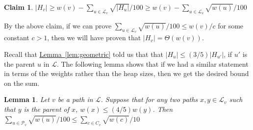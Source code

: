 \documentclass[11pt]{article}
\newtheorem{lemma}[theorem]{Lemma}
\newtheorem{claim}[theorem]{Claim}
\theoremstyle{definition}
\newcommand{\Lem}[1]{\hyperref[lem:#1]{Lemma~\ref*{lem:#1}}} %
\begin{document}
\begin{claim}
$|H_v|\geq w(v)-\sum_{u\in \mathcal{L}_v} \sqrt{|H_u|}/100 \geq w(v)-\sum_{u\in \mathcal{L}_v} \sqrt{w(u)}/100$
\end{claim}

By the above claim, if we can prove $\sum_{u\in \mathcal{L}_v} \sqrt{w(u)}/100 \leq w(v)/c$ for some constant $c>1$, 
then we will have proven that $|H_v| = \Theta(w(v))$.  

Recall that \Lem{geometric} told us that that $|H_{u}|\leq (3/5) |H_{u'}|$, if $u'$ is the parent $u$ in $\mathcal{L}$. 
The following lemma shows that if we had a similar statement in terms of the weights rather than the heap sizes, 
then we get the desired bound on the sum.

\begin{lemma}
\label{lem:distribution}
Let $v$ be a path in $\mathcal{L}$.  Suppose that for any two paths $x,y\in \mathcal{L}_v$ 
such that $y$ is the parent of $x$, $w(x)\leq (4/5) w(y)$.
Then $\sum_{u\in \mathcal{P}_v} \sqrt{w(u)}/100 \leq \sum_{c\in C_v} \sqrt{w(c)}/10$
\end{lemma}
\end{document}
